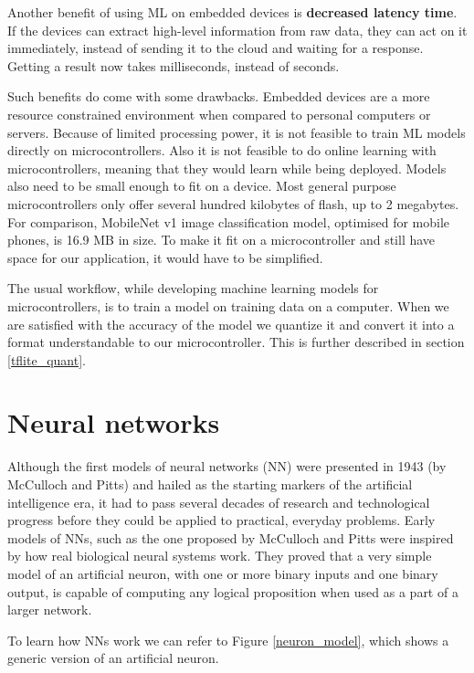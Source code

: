 Another benefit of using ML on embedded devices is \textbf{decreased latency time}.
If the devices can extract high-level information from raw data, they can act on it immediately, instead of sending it to the cloud and waiting for a response. 
Getting a result now takes milliseconds, instead of seconds.

Such benefits do come with some drawbacks.
Embedded devices are a more resource constrained environment when compared to personal computers or servers.
Because of limited processing power, it is not feasible to train ML models directly on microcontrollers.
Also it is not feasible to do online learning with microcontrollers, meaning that they would learn while being deployed.
Models also need to be small enough to fit on a device. 
Most general purpose microcontrollers only offer several hundred kilobytes of flash, up to 2 megabytes.
For comparison, MobileNet v1 image classification model, optimised for mobile phones, is 16.9 MB in size\cite{daniel_edgeimpulse}.
To make it fit on a microcontroller and still have space for our application, it would have to be simplified.

The usual workflow, while developing machine learning models for microcontrollers, is to train a model on training data on a computer. 
When we are satisfied with the accuracy of the model we quantize it and convert it into a format understandable to our microcontroller.
This is further described in section \ref{tflite_quant}.

\section{ Neural networks}\label{neural_networks_section}

Although the first models of neural networks (NN) were presented in 1943 (by McCulloch and Pitts)\cite{geron} and hailed as the starting markers of the artificial intelligence era, it had to pass several decades of research and technological progress before they could be applied to practical, everyday problems.
Early models of NNs, such as the one proposed by McCulloch and Pitts were inspired by how real biological neural systems work. 
They proved that a very simple model of an artificial neuron, with one or more binary inputs and one binary output, is capable of computing any logical proposition when used as a part of a larger network\cite{geron}.

To learn how NNs work we can refer to Figure \ref{neuron_model}, which shows a generic version of an artificial neuron.
\newline

